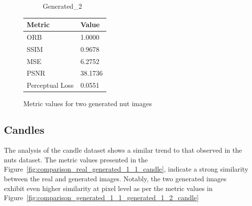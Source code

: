 \documentclass[12pt,DIV14,BCOR12mm,a4paper,footinclude=false,headinclude,parskip=half-,twoside,openright,cleardoublepage=empty,toc=index,bibliography=totoc,listof=totoc]{scrreprt}
\numberwithin{equation}{chapter}
\begin{document}
\begin{figure}
\begin{minipage}[H]{\linewidth}
\begin{minipage}[H]{0.5\linewidth}
\begin{subfigure}[t]{0.48\linewidth}
                \caption{Generated\_2}
            \end{subfigure}
        \end{minipage}%
        \hfill
        \begin{minipage}[H]{0.5\linewidth} %
            \centering
            \small
            \begin{tabular}{p{3cm} p{2cm}}
                \toprule
                \textbf{Metric} & \textbf{Value} \\
                \midrule
                ORB             & 1.0000        \\
                SSIM            & 0.9678        \\
                MSE             & 6.2752        \\
                PSNR            & 38.1736       \\
                Perceptual Loss & 0.0551        \\
                \bottomrule
            \end{tabular}
        \end{minipage}%
        \caption{Metric values for two generated nut images}
        \label{fig:comparison_metrics_two_generated_nut}
    \end{minipage}
\end{figure}


\subsection{Candles}

The analysis of the candle dataset shows a similar trend to that observed in the nuts dataset. The metric values presented in the Figure~\ref{fig:comparison_real_generated_1_1_candle}, indicate a strong similarity between the real and generated images. Notably, the two generated images exhibit even higher similarity at pixel level as per the metric values in Figure~\ref{fig:comparison_generated_1_1_generated_1_2_candle}
\end{document}
